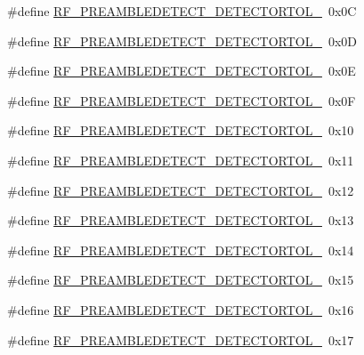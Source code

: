\begin{DoxyCompactItemize}
\item 
\#define \hyperlink{sx1276Regs-Fsk_8h_a7d2f3b00426a551c8ae401881717dcca}{R\+F\+\_\+\+P\+R\+E\+A\+M\+B\+L\+E\+D\+E\+T\+E\+C\+T\+\_\+\+D\+E\+T\+E\+C\+T\+O\+R\+T\+O\+L\+\_}~0x0C
\item 
\#define \hyperlink{sx1276Regs-Fsk_8h_ab4eac0c4501804c8c5c9a3b7634ea151}{R\+F\+\_\+\+P\+R\+E\+A\+M\+B\+L\+E\+D\+E\+T\+E\+C\+T\+\_\+\+D\+E\+T\+E\+C\+T\+O\+R\+T\+O\+L\+\_}~0x0D
\item 
\#define \hyperlink{sx1276Regs-Fsk_8h_a1699af63f8c2a4aafc0b0b3545de7caf}{R\+F\+\_\+\+P\+R\+E\+A\+M\+B\+L\+E\+D\+E\+T\+E\+C\+T\+\_\+\+D\+E\+T\+E\+C\+T\+O\+R\+T\+O\+L\+\_}~0x0E
\item 
\#define \hyperlink{sx1276Regs-Fsk_8h_ad13b9c3f0b1ba1eea748751f8cff07e0}{R\+F\+\_\+\+P\+R\+E\+A\+M\+B\+L\+E\+D\+E\+T\+E\+C\+T\+\_\+\+D\+E\+T\+E\+C\+T\+O\+R\+T\+O\+L\+\_}~0x0F
\item 
\#define \hyperlink{sx1276Regs-Fsk_8h_aad1ba5659a47a05311fc9165df1df0c7}{R\+F\+\_\+\+P\+R\+E\+A\+M\+B\+L\+E\+D\+E\+T\+E\+C\+T\+\_\+\+D\+E\+T\+E\+C\+T\+O\+R\+T\+O\+L\+\_}~0x10
\item 
\#define \hyperlink{sx1276Regs-Fsk_8h_a79fe78ed30bace2a4a4dc589bb5277fc}{R\+F\+\_\+\+P\+R\+E\+A\+M\+B\+L\+E\+D\+E\+T\+E\+C\+T\+\_\+\+D\+E\+T\+E\+C\+T\+O\+R\+T\+O\+L\+\_}~0x11
\item 
\#define \hyperlink{sx1276Regs-Fsk_8h_ad969caed7162a965ea9c8469d45c42dd}{R\+F\+\_\+\+P\+R\+E\+A\+M\+B\+L\+E\+D\+E\+T\+E\+C\+T\+\_\+\+D\+E\+T\+E\+C\+T\+O\+R\+T\+O\+L\+\_}~0x12
\item 
\#define \hyperlink{sx1276Regs-Fsk_8h_a6295b4fba95341315d256126bdb6506d}{R\+F\+\_\+\+P\+R\+E\+A\+M\+B\+L\+E\+D\+E\+T\+E\+C\+T\+\_\+\+D\+E\+T\+E\+C\+T\+O\+R\+T\+O\+L\+\_}~0x13
\item 
\#define \hyperlink{sx1276Regs-Fsk_8h_a685d199aafb86300e1bbcc48cd2b5646}{R\+F\+\_\+\+P\+R\+E\+A\+M\+B\+L\+E\+D\+E\+T\+E\+C\+T\+\_\+\+D\+E\+T\+E\+C\+T\+O\+R\+T\+O\+L\+\_}~0x14
\item 
\#define \hyperlink{sx1276Regs-Fsk_8h_aeb0a1361059deb9b9d086027dbfc1e9e}{R\+F\+\_\+\+P\+R\+E\+A\+M\+B\+L\+E\+D\+E\+T\+E\+C\+T\+\_\+\+D\+E\+T\+E\+C\+T\+O\+R\+T\+O\+L\+\_}~0x15
\item 
\#define \hyperlink{sx1276Regs-Fsk_8h_a047c2d4c92a0348034cb38f31878a72a}{R\+F\+\_\+\+P\+R\+E\+A\+M\+B\+L\+E\+D\+E\+T\+E\+C\+T\+\_\+\+D\+E\+T\+E\+C\+T\+O\+R\+T\+O\+L\+\_}~0x16
\item 
\#define \hyperlink{sx1276Regs-Fsk_8h_a2e8f5ccecf0338fbb43c7aace746214b}{R\+F\+\_\+\+P\+R\+E\+A\+M\+B\+L\+E\+D\+E\+T\+E\+C\+T\+\_\+\+D\+E\+T\+E\+C\+T\+O\+R\+T\+O\+L\+\_}~0x17

\end{DoxyCompactItemize}
